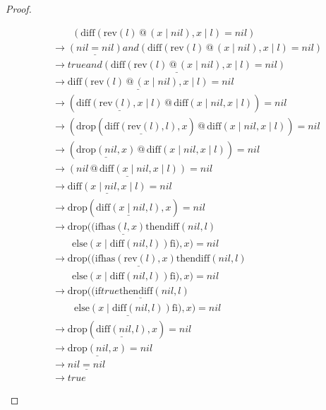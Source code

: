 \documentclass[12pt, a4paper]{article}
\newcommand{\rel}[1]{\mathrel{#1}}
\newcommand{\rmx}[1]{\mathrm{#1}}
\newcommand{\larrow}{\longrightarrow}
\newcommand{\under}{\underline}
\begin{document}
\begin{proof}
\begin{description}
\begin{align*}
	&\quad \quad (\rmx{diff}(\rmx{rev}(l) \rel{@} (x \mid nil), x \mid l) = nil) \tag{by Problem 7} \\
	 &\larrow \under{(nil = nil)} \rel{and} (\rmx{diff}(\rmx{rev}(l) \rel{@} (x \mid nil), x \mid l) = nil) \tag{by diff1} \\
	 &\larrow \under{true \rel{and} (\rmx{diff}(\rmx{rev}(l) \rel{@} (x \mid nil), x \mid l) = nil)} \tag{by equality} \\
	 &\larrow \under{\rmx{diff}(\rmx{rev}(l) \rel{@} (x \mid nil), x \mid l)} = nil \tag{by and} \\
	 &\larrow (\under{\rmx{diff}(\rmx{rev}(l), x \mid l)} \rel{@}  \rmx{diff}(x \mid nil, x \mid l)) = nil \tag{by Problem 9 - Lemma 1} \\
	 &\larrow (\rmx{drop}(\under{\rmx{diff}(\rmx{rev}(l), l)}, x) \rel{@}  \rmx{diff}(x \mid nil, x \mid l)) = nil \tag{by Problem 14} \\
	 &\larrow (\under{\rmx{drop}(nil, x)} \rel{@}  \rmx{diff}(x \mid nil, x \mid l)) = nil \tag{by Problem 16} \\
	 &\larrow \under{(nil \rel{@}  \rmx{diff}(x \mid nil, x \mid l))} = nil \tag{by drop1} \\
	 &\larrow \under{\rmx{diff}(x \mid nil, x \mid l)} = nil \tag{by @1} \\
	 &\larrow \rmx{drop}(\under{\rmx{diff}(x \mid nil, l)}, x) = nil \tag{by Problem 14} \\
	 &\larrow \rmx{drop}((\rel{\rmx{if}} \under{\rmx{has}(l, x)} \rel{\rmx{then}} \rmx{diff}(nil, l) \\
	 &\quad \quad \rel{\rmx{else}} (x \mid \rmx{diff}(nil, l)) \rel{\rmx{fi}}), x) = nil \tag{by diff2} \\
	 &\larrow \rmx{drop}((\rel{\rmx{if}} \under{\rmx{has}(\rmx{rev}(l), x)} \rel{\rmx{then}} \rmx{diff}(nil, l) \\
	 &\quad \quad \rel{\rmx{else}} (x \mid \rmx{diff}(nil, l)) \rel{\rmx{fi}}), x) = nil \tag{by Problem 6} \\
	 &\larrow \rmx{drop}(\under{(\rel{\rmx{if}} true \rel{\rmx{then}} \rmx{diff}(nil, l)} \\
	 &\quad \quad\ \under{\rel{\rmx{else}} (x \mid \rmx{diff}(nil, l)) \rel{\rmx{fi}})}, x) = nil \tag{by case splitting} \\
	 &\larrow \rmx{drop}(\under{\rmx{diff}(nil, l)}, x) = nil \tag{by if1} \\
	 &\larrow \under{\rmx{drop}(nil, x)} = nil \tag{by diff1} \\
	 &\larrow \under{nil = nil} \tag{by drop1} \\
	 &\larrow true \tag{by equality}
\end{align*}


\end{description}
\end{proof}
\end{document}
